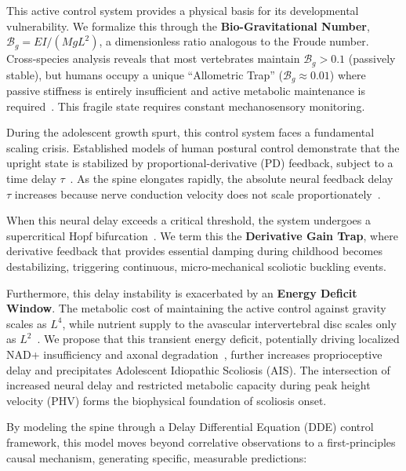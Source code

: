 \documentclass[11pt]{article}
\begin{document}
This active control system provides a physical basis for its developmental vulnerability. We formalize this through the \textbf{Bio-Gravitational Number}, $\mathcal{B}_g = EI / (M g L^2)$, a dimensionless ratio analogous to the Froude number. Cross-species analysis reveals that most vertebrates maintain $\mathcal{B}_g > 0.1$ (passively stable), but humans occupy a unique ``Allometric Trap'' ($\mathcal{B}_g \approx 0.01$) where passive stiffness is entirely insufficient and active metabolic maintenance is required~\cite{lovejoy2005hominid, Meyer_2021}. This fragile state requires constant mechanosensory monitoring.

During the adolescent growth spurt, this control system faces a fundamental scaling crisis. Established models of human postural control demonstrate that the upright state is stabilized by proportional-derivative (PD) feedback, subject to a time delay $\tau$~\cite{milton2009time, insperger2013acceleration}. As the spine elongates rapidly, the absolute neural feedback delay $\tau$ increases because nerve conduction velocity does not scale proportionately~\cite{lang1985nerve}.

When this neural delay exceeds a critical threshold, the system undergoes a supercritical Hopf bifurcation~\cite{landry2005dynamics}. We term this the \textbf{Derivative Gain Trap}, where derivative feedback that provides essential damping during childhood becomes destabilizing, triggering continuous, micro-mechanical scoliotic buckling events.

Furthermore, this delay instability is exacerbated by an \textbf{Energy Deficit Window}. The metabolic cost of maintaining the active control against gravity scales as $L^4$, while nutrient supply to the avascular intervertebral disc scales only as $L^2$~\cite{urban2004nutrition, sato2025convective}. We propose that this transient energy deficit, potentially driving localized NAD+ insufficiency and axonal degradation~\cite{basse2021nampt, gerdts2015sarm1}, further increases proprioceptive delay and precipitates Adolescent Idiopathic Scoliosis (AIS). The intersection of increased neural delay and restricted metabolic capacity during peak height velocity (PHV) forms the biophysical foundation of scoliosis onset.

By modeling the spine through a Delay Differential Equation (DDE) control framework, this model moves beyond correlative observations to a first-principles causal mechanism, generating specific, measurable predictions:
\end{document}
